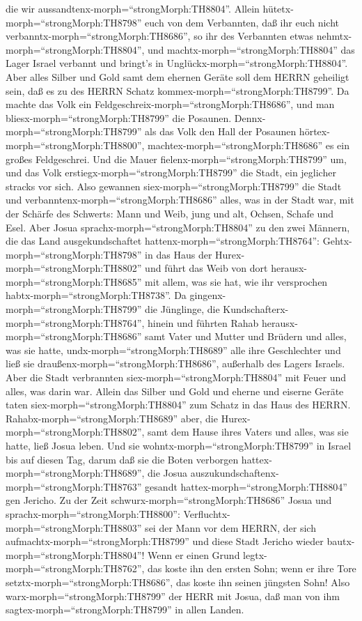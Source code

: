 die wir aussandtenx-morph=``strongMorph:TH8804''.  Allein
hütetx-morph=``strongMorph:TH8798'' euch von dem Verbannten, daß ihr
euch nicht verbanntx-morph=``strongMorph:TH8686'', so ihr des Verbannten
etwas nehmtx-morph=``strongMorph:TH8804'', und
machtx-morph=``strongMorph:TH8804'' das Lager Israel verbannt und
bringt's in Unglückx-morph=``strongMorph:TH8804''.  Aber
alles Silber und Gold samt dem ehernen Geräte soll dem HERRN geheiligt
sein, daß es zu des HERRN Schatz kommex-morph=``strongMorph:TH8799''.
 Da machte das Volk ein
Feldgeschreix-morph=``strongMorph:TH8686'', und man
bliesx-morph=``strongMorph:TH8799'' die Posaunen.
Dennx-morph=``strongMorph:TH8799'' als das Volk den Hall der Posaunen
hörtex-morph=``strongMorph:TH8800'',
machtex-morph=``strongMorph:TH8686'' es ein großes Feldgeschrei. Und die
Mauer fielenx-morph=``strongMorph:TH8799'' um, und das Volk
erstiegx-morph=``strongMorph:TH8799'' die Stadt, ein jeglicher stracks
vor sich. Also gewannen siex-morph=``strongMorph:TH8799'' die Stadt
 und verbanntenx-morph=``strongMorph:TH8686'' alles, was in
der Stadt war, mit der Schärfe des Schwerts: Mann und Weib, jung und
alt, Ochsen, Schafe und Esel.  Aber Josua
sprachx-morph=``strongMorph:TH8804'' zu den zwei Männern, die das Land
ausgekundschaftet hattenx-morph=``strongMorph:TH8764'':
Gehtx-morph=``strongMorph:TH8798'' in das Haus der
Hurex-morph=``strongMorph:TH8802'' und führt das Weib von dort
herausx-morph=``strongMorph:TH8685'' mit allem, was sie hat, wie ihr
versprochen habtx-morph=``strongMorph:TH8738''.  Da
gingenx-morph=``strongMorph:TH8799'' die Jünglinge, die
Kundschafterx-morph=``strongMorph:TH8764'', hinein und führten Rahab
herausx-morph=``strongMorph:TH8686'' samt Vater und Mutter und Brüdern
und alles, was sie hatte, undx-morph=``strongMorph:TH8689'' alle ihre
Geschlechter und ließ sie draußenx-morph=``strongMorph:TH8686'',
außerhalb des Lagers Israels.  Aber die Stadt verbrannten
siex-morph=``strongMorph:TH8804'' mit Feuer und alles, was darin war.
Allein das Silber und Gold und eherne und eiserne Geräte taten
siex-morph=``strongMorph:TH8804'' zum Schatz in das Haus des HERRN.
 Rahabx-morph=``strongMorph:TH8689'' aber, die
Hurex-morph=``strongMorph:TH8802'', samt dem Hause ihres Vaters und
alles, was sie hatte, ließ Josua leben. Und sie
wohntx-morph=``strongMorph:TH8799'' in Israel bis auf diesen Tag, darum
daß sie die Boten verborgen hattex-morph=``strongMorph:TH8689'', die
Josua auszukundschaftenx-morph=``strongMorph:TH8763'' gesandt
hattex-morph=``strongMorph:TH8804'' gen Jericho.  Zu der
Zeit schwurx-morph=``strongMorph:TH8686'' Josua und
sprachx-morph=``strongMorph:TH8800'':
Verfluchtx-morph=``strongMorph:TH8803'' sei der Mann vor dem HERRN, der
sich aufmachtx-morph=``strongMorph:TH8799'' und diese Stadt Jericho
wieder bautx-morph=``strongMorph:TH8804''! Wenn er einen Grund
legtx-morph=``strongMorph:TH8762'', das koste ihn den ersten Sohn; wenn
er ihre Tore setztx-morph=``strongMorph:TH8686'', das koste ihn seinen
jüngsten Sohn!  Also warx-morph=``strongMorph:TH8799'' der
HERR mit Josua, daß man von ihm sagtex-morph=``strongMorph:TH8799'' in
allen Landen.

